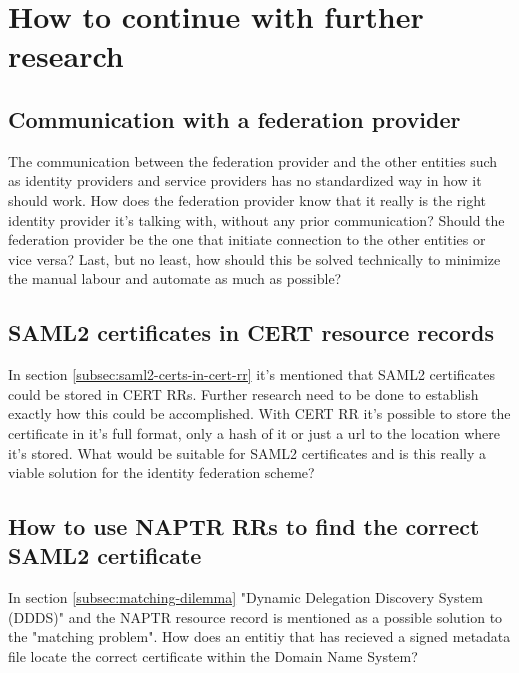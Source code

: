 \section{How to continue with further research}
\subsection{Communication with a federation provider}
The communication between the federation provider and the other entities such as identity providers and service providers has no standardized way in how it should work.
How does the federation provider know that it really is the right identity provider it's talking with, without any prior communication?
Should the federation provider be the one that initiate connection to the other entities or vice versa?
Last, but no least, how should this be solved technically to minimize the manual labour and automate as much as possible?

\subsection{SAML2 certificates in CERT resource records}
In section \ref{subsec:saml2-certs-in-cert-rr} it's mentioned that SAML2 certificates could be stored in CERT RRs.
Further research need to be done to establish exactly how this could be accomplished.
With CERT RR it's possible to store the certificate in it's full format, only a hash of it or just a url to the location where it's stored\cite[ch. 2.1]{rfc:4398}.
What would be suitable for SAML2 certificates and is this really a viable solution for the identity federation scheme?

\subsection{How to use NAPTR RRs to find the correct SAML2 certificate}
In section \ref{subsec:matching-dilemma} "Dynamic Delegation Discovery System (DDDS)"\cite{rfc:3401,rfc:3402,rfc:3403,rfc:3404} and the NAPTR resource record\cite{rfc:3403} is mentioned as a possible solution to the "matching problem".
How does an entitiy that has recieved a signed metadata file locate the correct certificate within the Domain Name System?


